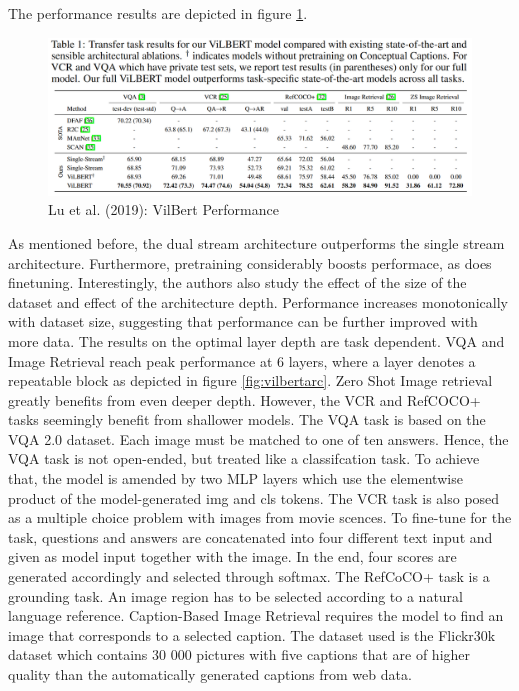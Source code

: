 \documentclass[
]{krantz}
\begin{document}
The performance results are depicted in figure \ref{fig:vilbertresults}.

\begin{figure}

{\centering \includegraphics[width=1\linewidth]{figures/05-chapter2/vilbertresults} 

}

\caption{Lu et al. (2019): VilBert Performance}\label{fig:vilbertresults}
\end{figure}

As mentioned before, the dual stream architecture outperforms the single stream architecture. Furthermore, pretraining considerably boosts performace, as does finetuning.
Interestingly, the authors also study the effect of the size of the dataset and effect of the architecture depth. Performance increases monotonically with dataset size, suggesting that performance can be further improved
with more data. The results on the optimal layer depth are task dependent. VQA and Image Retrieval reach peak performance at 6 layers, where a layer denotes a repeatable block as depicted in figure \ref{fig:vilbertarc}. Zero Shot Image retrieval
greatly benefits from even deeper depth. However, the VCR and RefCOCO+ tasks seemingly benefit from shallower models.
The VQA task is based on the VQA 2.0 dataset. Each image must be matched to one of ten answers. Hence, the VQA task is not open-ended, but treated like a classifcation task. To achieve that, the model is amended by two
MLP layers which use the elementwise product of the model-generated img and cls tokens.
The VCR task is also posed as a multiple choice problem with images from movie scences. To fine-tune for the task, questions and answers are concatenated into four different text input and given as model input together with the image.
In the end, four scores are generated accordingly and selected through softmax.
The RefCoCO+ task is a grounding task. An image region has to be selected according to a natural language reference.
Caption-Based Image Retrieval requires the model to find an image that corresponds to a selected caption. The dataset used is the Flickr30k dataset which contains 30 000 pictures with five captions that are of higher quality than the automatically generated captions from web data.
\end{document}
